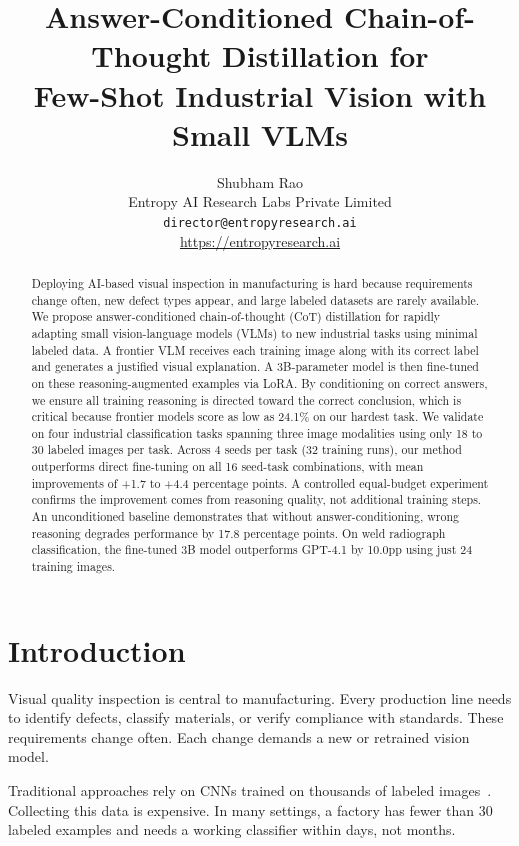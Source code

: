 \documentclass[11pt]{article}
\title{Answer-Conditioned Chain-of-Thought Distillation for\\Few-Shot Industrial Vision with Small VLMs}
\author{
  Shubham Rao\\
  Entropy AI Research Labs Private Limited\\
  \texttt{director@entropyresearch.ai}\\
  \url{https://entropyresearch.ai}
}
\date{}
\begin{document}
\maketitle

\begin{abstract}
Deploying AI-based visual inspection in manufacturing is hard because requirements change often, new defect types appear, and large labeled datasets are rarely available. We propose answer-conditioned chain-of-thought (CoT) distillation for rapidly adapting small vision-language models (VLMs) to new industrial tasks using minimal labeled data. A frontier VLM receives each training image along with its correct label and generates a justified visual explanation. A 3B-parameter model is then fine-tuned on these reasoning-augmented examples via LoRA. By conditioning on correct answers, we ensure all training reasoning is directed toward the correct conclusion, which is critical because frontier models score as low as 24.1\% on our hardest task. We validate on four industrial classification tasks spanning three image modalities using only 18 to 30 labeled images per task. Across 4 seeds per task (32 training runs), our method outperforms direct fine-tuning on all 16 seed-task combinations, with mean improvements of +1.7 to +4.4 percentage points. A controlled equal-budget experiment confirms the improvement comes from reasoning quality, not additional training steps. An unconditioned baseline demonstrates that without answer-conditioning, wrong reasoning degrades performance by 17.8 percentage points. On weld radiograph classification, the fine-tuned 3B model outperforms GPT-4.1 by 10.0pp using just 24 training images.
\end{abstract}


\section{Introduction}
\label{sec:intro}

Visual quality inspection is central to manufacturing. Every production line needs to identify defects, classify materials, or verify compliance with standards. These requirements change often. Each change demands a new or retrained vision model.

Traditional approaches rely on CNNs trained on thousands of labeled images~\cite{czimmermann2020visual}. Collecting this data is expensive. In many settings, a factory has fewer than 30 labeled examples and needs a working classifier within days, not months.
\end{document}
